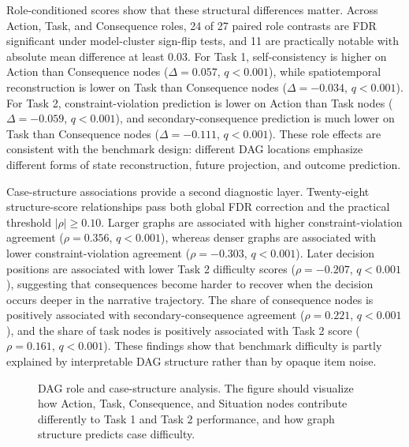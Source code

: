 \documentclass[pdflatex,sn-mathphys-num]{sn-jnl}%
\theoremstyle{thmstyleone}%
\theoremstyle{thmstyletwo}%
\theoremstyle{thmstylethree}%
\begin{document}
Role-conditioned scores show that these structural differences matter. Across Action, Task, and Consequence roles, 24 of 27 paired role contrasts are FDR significant under model-cluster sign-flip tests, and 11 are practically notable with absolute mean difference at least 0.03. For Task 1, self-consistency is higher on Action than Consequence nodes ($\Delta=0.057$, $q<0.001$), while spatiotemporal reconstruction is lower on Task than Consequence nodes ($\Delta=-0.034$, $q<0.001$). For Task 2, constraint-violation prediction is lower on Action than Task nodes ($\Delta=-0.059$, $q<0.001$), and secondary-consequence prediction is much lower on Task than Consequence nodes ($\Delta=-0.111$, $q<0.001$). These role effects are consistent with the benchmark design: different DAG locations emphasize different forms of state reconstruction, future projection, and outcome prediction.

Case-structure associations provide a second diagnostic layer. Twenty-eight structure-score relationships pass both global FDR correction and the practical threshold $|\rho|\ge 0.10$. Larger graphs are associated with higher constraint-violation agreement ($\rho=0.356$, $q<0.001$), whereas denser graphs are associated with lower constraint-violation agreement ($\rho=-0.303$, $q<0.001$). Later decision positions are associated with lower Task 2 difficulty scores ($\rho=-0.207$, $q<0.001$), suggesting that consequences become harder to recover when the decision occurs deeper in the narrative trajectory. The share of consequence nodes is positively associated with secondary-consequence agreement ($\rho=0.221$, $q<0.001$), and the share of task nodes is positively associated with Task 2 score ($\rho=0.161$, $q<0.001$). These findings show that benchmark difficulty is partly explained by interpretable DAG structure rather than by opaque item noise.

\begin{figure}[htbp]
\centering
{}
\caption{DAG role and case-structure analysis. The figure should visualize how Action, Task, Consequence, and Situation nodes contribute differently to Task 1 and Task 2 performance, and how graph structure predicts case difficulty.}
\label{fig:results-node-structure}
\end{figure}
\end{document}
